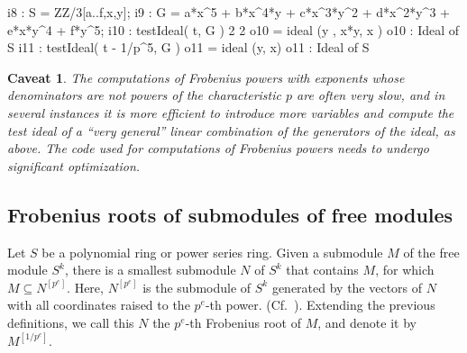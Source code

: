 \documentclass{amsart}
\newcommand{\pedro}[2][]
{\todo[linecolor=blue,backgroundcolor=blue!10,caption={}, #1]{#2}}
\newtheorem*{caveat}{Caveat}
\begin{document}
\medskip
{\small
\begin{MyVerbatim}
i8 : S = ZZ/3[a..f,x,y];
i9 : G = a*x^5 + b*x^4*y + c*x^3*y^2 + d*x^2*y^3 + e*x*y^4 + f*y^5;
i10 : testIdeal( t, G )
              2        2
o10 = ideal (y , x*y, x )
o10 : Ideal of S
i11 : testIdeal( t - 1/p^5, G )
o11 = ideal (y, x)
o11 : Ideal of S
\end{MyVerbatim}
}
\medskip

\begin{caveat}
   The computations of Frobenius powers with exponents whose denominators are not powers of the characteristic $p$ are often very slow, and in several instances it is more efficient to introduce more variables and compute the test ideal of a ``very general'' linear combination of the generators of the ideal, as above.
   The code used for computations of Frobenius powers needs to undergo significant optimization.
\end{caveat}

\subsection{Frobenius  roots of submodules of free modules}

Let $S$ be a polynomial ring or power series ring.
Given a submodule $M$ of the free module $S^k$,
%
%
there is a smallest submodule $N$ of $S^k$ that contains $M$, for which $M\subseteq N^{[p^e]}$.
Here,  $N^{[p^e]}$ is the submodule  of $S^k$ generated by the vectors of $N$ with all coordinates raised to the $p^e$-th power. (Cf.~\cite{KatzmanZhangAlgorithm}).
Extending the previous definitions,
we call this $N$ the $p^e$-th Frobenius root of $M$, and denote it by $M^{[1/p^e]}$.
\end{document}
